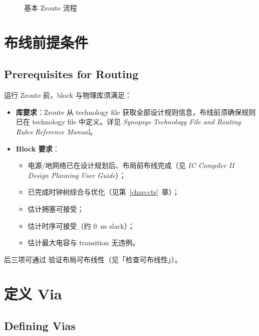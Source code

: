 \begin{figure}[htbp]
\centering
{}
\caption{基本 Zroute 流程}
\label{fig:basic-zroute-flow}
\end{figure}

\section{布线前提条件}
\subsection*{Prerequisites for Routing}

运行 Zroute 前，block 与物理库须满足：
\begin{itemize}
  \item \textbf{库要求}：Zroute 从 technology file 获取全部设计规则信息，布线前须确保规则已在 technology file 中定义。详见 \textit{Synopsys Technology File and Routing Rules Reference Manual}。
  \item \textbf{Block 要求}：
  \begin{itemize}
    \item 电源/地网络已在设计规划后、布局前布线完成（见 \textit{IC Compiler II Design Planning User Guide}）；
    \item 已完成时钟树综合与优化（见第~\ref{chap:cts}~章）；
    \item 估计拥塞可接受；
    \item 估计时序可接受（约 0~ns slack）；
    \item 估计最大电容与 transition 无违例。
  \end{itemize}
\end{itemize}
后三项可通过  验证布局可布线性（见「检查可布线性」）。

\section{定义 Via}
\subsection*{Defining Vias}

